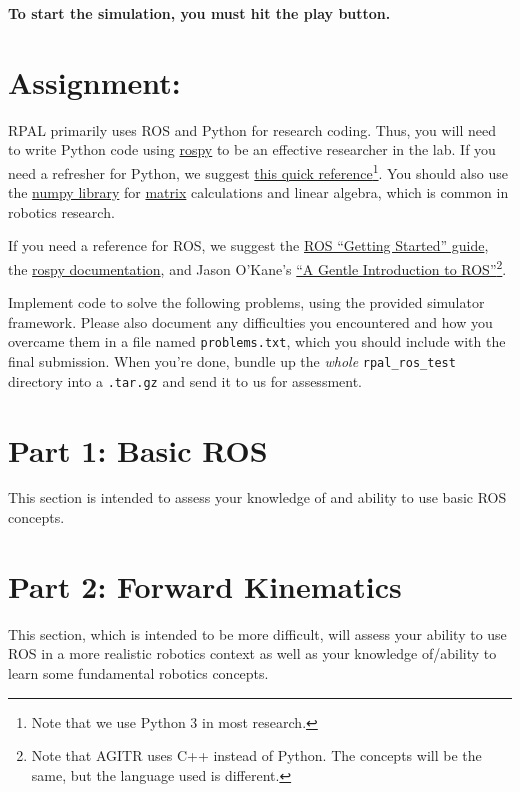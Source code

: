 \documentclass[11pt]{article}
\begin{document}
\textbf{To start the simulation, you must hit the play button.}

\section{Assignment:}

RPAL primarily uses ROS and Python for research coding. Thus, you will need to write Python code
using \href{http://wiki.ros.org/rospy}{rospy} to be an effective researcher in the lab. If you need
a refresher for Python, we suggest \href{https://learnxinyminutes.com/docs/python/}{this quick
reference}\footnote{Note that we use Python 3 in most research.}. You should also use the
\href{http://www.numpy.org/}{numpy library} for
\href{https://docs.scipy.org/doc/numpy-1.14.0/reference/generated/numpy.matrix.html}{matrix}
calculations and linear algebra, which is common in robotics research.

If you need a reference for ROS, we suggest the \href{http://wiki.ros.org/ROS/StartGuide}{ROS
``Getting Started'' guide}, the \href{http://wiki.ros.org/rospy}{rospy documentation}, and Jason
O'Kane's \href{https://cse.sc.edu/~jokane/agitr/agitr-letter.pdf}{``A Gentle Introduction to
ROS''}\footnote{Note that AGITR uses C++ instead of Python. The concepts will be the same, but the
language used is different.}.

Implement code to solve the following problems, using the provided simulator framework. Please also
document any difficulties you encountered and how you overcame them in a file named
\texttt{problems.txt}, which you should include with the final submission. When you're done, bundle
up the \emph{whole} \texttt{rpal\_ros\_test} directory into a \texttt{.tar.gz} and send it to us for
assessment.

\section{Part 1: Basic ROS}

This section is intended to assess your knowledge of and ability to use basic ROS concepts.






\section{Part 2: Forward Kinematics}

This section, which is intended to be more difficult, will assess your ability to use ROS in a more
realistic robotics context as well as your knowledge of/ability to learn some fundamental robotics
concepts.



\end{document}
